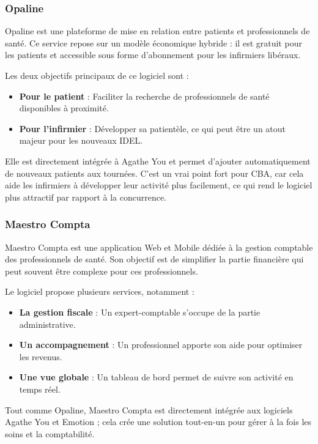 \documentclass{article}
\begin{document}
\subsubsection{Opaline}

Opaline est une plateforme de mise en relation entre patients et professionnels de santé. Ce service repose sur un modèle économique hybride : il est gratuit pour les patients et accessible sous forme d'abonnement pour les infirmiers libéraux.

Les deux objectifs principaux de ce logiciel sont :

\begin{itemize}
    \item \textbf{Pour le patient} : Faciliter la recherche de professionnels de santé disponibles à proximité.
    \item \textbf{Pour l'infirmier} : Développer sa patientèle, ce qui peut être un atout majeur pour les nouveaux IDEL.
\end{itemize}

Elle est directement intégrée à Agathe You et permet d'ajouter automatiquement de nouveaux patients aux tournées. C'est un vrai point fort pour CBA, car cela aide les infirmiers à développer leur activité plus facilement, ce qui rend le logiciel plus attractif par rapport à la concurrence.

\subsubsection{Maestro Compta}

Maestro Compta est une application Web et Mobile dédiée à la gestion comptable des professionnels de santé. Son objectif est de simplifier la partie financière qui peut souvent être complexe pour ces professionnels.

Le logiciel propose plusieurs services, notamment :

\begin{itemize}
    \item \textbf{La gestion fiscale} : Un expert-comptable s'occupe de la partie administrative.
    \item \textbf{Un accompagnement} : Un professionnel apporte son aide pour optimiser les revenus.
    \item \textbf{Une vue globale} : Un tableau de bord permet de suivre son activité en temps réel.
\end{itemize}

Tout comme Opaline, Maestro Compta est directement intégrée aux logiciels Agathe You et Emotion ; cela crée une solution tout-en-un pour gérer à la fois les soins et la comptabilité.
\end{document}
